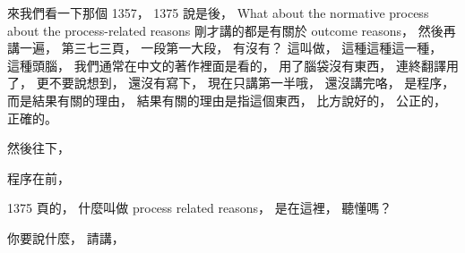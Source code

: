 \hypertarget{w06:cue:2044}{}來我們看一下那個 1357，
\hypertarget{w06:cue:2045}{}1375 說是後，
\hypertarget{w06:cue:2046}{}What about the normative process
\hypertarget{w06:cue:2047}{}about the process-related reasons
\hypertarget{w06:cue:2048}{}剛才講的都是有關於 outcome reasons，
\hypertarget{w06:cue:2049}{}然後再講一遍，
\hypertarget{w06:cue:2050}{}第三七三頁，
\hypertarget{w06:cue:2051}{}一段第一大段，
\hypertarget{w06:cue:2052}{}有沒有？
\hypertarget{w06:cue:2053}{}這叫做，
\hypertarget{w06:cue:2054}{}這種這種這一種，
\hypertarget{w06:cue:2055}{}這種頭腦，
\hypertarget{w06:cue:2056}{}我們通常在中文的著作裡面是看的，
\hypertarget{w06:cue:2057}{}用了腦袋沒有東西，
\hypertarget{w06:cue:2058}{}連終翻譯用了，
\hypertarget{w06:cue:2059}{}更不要說想到，
\hypertarget{w06:cue:2060}{}還沒有寫下，
\hypertarget{w06:cue:2061}{}現在只講第一半哦，
\hypertarget{w06:cue:2062}{}還沒講完咯，
\hypertarget{w06:cue:2063}{}是程序，
\hypertarget{w06:cue:2064}{}而是結果有關的理由，
\hypertarget{w06:cue:2065}{}結果有關的理由是指這個東西，
\hypertarget{w06:cue:2066}{}比方說好的，
\hypertarget{w06:cue:2067}{}公正的，
\hypertarget{w06:cue:2068}{}正確的。

\hypertarget{w06:cue:2069}{}然後往下，

\hypertarget{w06:cue:2070}{}程序在前，

\hypertarget{w06:cue:2071}{}1375 頁的，
\hypertarget{w06:cue:2072}{}什麼叫做 process related reasons，
\hypertarget{w06:cue:2073}{}是在這裡，
\hypertarget{w06:cue:2074}{}聽懂嗎？

\hypertarget{w06:cue:2075}{}你要說什麼，
\hypertarget{w06:cue:2076}{}請講，

